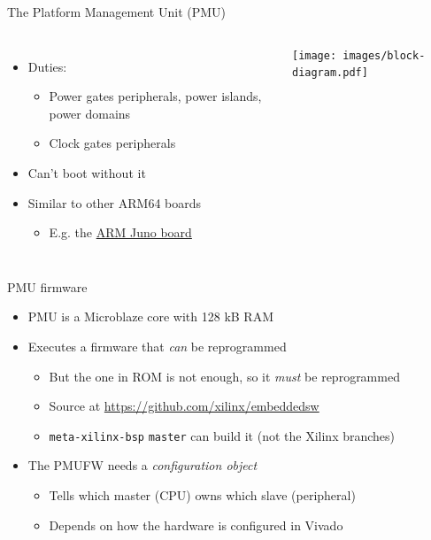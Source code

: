 \documentclass[xetex,table]{beamer}
\begin{document}
\begin{frame}{The Platform Management Unit (PMU)}
  \begin{columns}
  \begin{itemize}
  \item Duties:
    \begin{itemize}
    \item Power gates peripherals, power islands, power domains
    \item Clock gates peripherals
    \end{itemize}
  \item Can't boot without it
  \item Similar to other ARM64 boards
    \begin{itemize}
    \item E.g. the
      \href{https://developer.arm.com/products/system-design/development-boards/juno-development-board}{ARM
        Juno board}
    \end{itemize}
  \end{itemize}
    \texttt{[image: images/block-diagram.pdf]}
  \end{columns}
\end{frame}

\begin{frame}{PMU firmware}
  \begin{itemize}
  \item PMU is a Microblaze core with 128 kB RAM
  \item Executes a firmware that {\em can} be reprogrammed
    \begin{itemize}
    \item But the one in ROM is not enough, so it {\em must} be
      reprogrammed
    \item Source at \url{https://github.com/xilinx/embeddedsw}
    \item {\tt meta-xilinx-bsp} {\tt master} can build it (not the
      Xilinx branches)
    \end{itemize}
  \item The PMUFW needs a {\em configuration object}
    \begin{itemize}
    \item Tells which master (CPU) owns which slave (peripheral)
    \item Depends on how the hardware is configured in Vivado
    \end{itemize}
  \end{itemize}
\end{frame}
\end{document}
